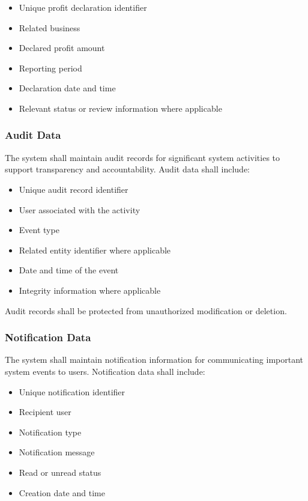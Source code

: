 \begin{itemize}
    \item Unique profit declaration identifier
    \item Related business
    \item Declared profit amount
    \item Reporting period
    \item Declaration date and time
    \item Relevant status or review information where applicable
\end{itemize}

\subsubsection{Audit Data}

The system shall maintain audit records for significant system activities
to support transparency and accountability. Audit data shall include:

\begin{itemize}
    \item Unique audit record identifier
    \item User associated with the activity
    \item Event type
    \item Related entity identifier where applicable
    \item Date and time of the event
    \item Integrity information where applicable
\end{itemize}

Audit records shall be protected from unauthorized modification or
deletion.

\subsubsection{Notification Data}

The system shall maintain notification information for communicating
important system events to users. Notification data shall include:

\begin{itemize}
    \item Unique notification identifier
    \item Recipient user
    \item Notification type
    \item Notification message
    \item Read or unread status
    \item Creation date and time
\end{itemize}

